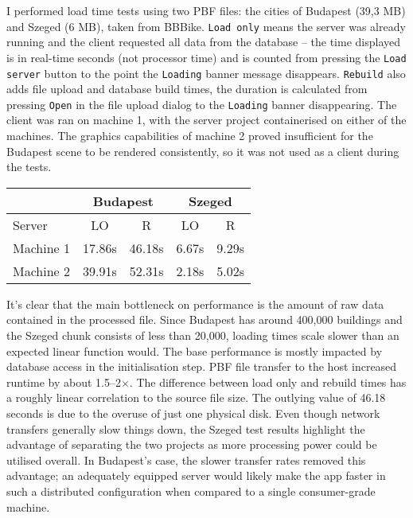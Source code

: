 I performed load time tests using two PBF files: the cities of Budapest (39,3 MB) and Szeged (6 MB), taken from BBBike. \verb|Load only| means the server was already running and the client requested all data from the database -- the time displayed is in real-time seconds (not processor time) and is counted from pressing the \verb|Load server| button to the point the \verb|Loading| banner message disappears. \verb|Rebuild| also adds file upload and database build times, the duration is calculated from pressing \verb|Open| in the file upload dialog to the \verb|Loading| banner disappearing. The client was ran on machine 1, with the server project containerised on either of the machines. The graphics capabilities of machine 2 proved insufficient for the Budapest scene to be rendered consistently, so it was not used as a client during the tests.

\begin{center}
    \begin{tabular}{l|cc|cc}
        \multicolumn{1}{c}{} & \multicolumn{2}{c}{Budapest} & \multicolumn{2}{c}{Szeged} \\
        \hline
        Server & LO & R & LO & R \\
        \hline
        Machine 1 & 17.86s & 46.18s & 6.67s & 9.29s \\
        Machine 2 & 39.91s & 52.31s & 2.18s & 5.02s \\
    \end{tabular}
\end{center}
It's clear that the main bottleneck on performance is the amount of raw data contained in the processed file. Since Budapest has around 400,000 buildings and the Szeged chunk consists of less than 20,000, loading times scale slower than an expected linear function would. The base performance is mostly impacted by database access in the initialisation step. PBF file transfer to the host increased runtime by about 1.5--2$\times$. The difference between load only and rebuild times has a roughly linear correlation to the source file size.
The outlying value of 46.18 seconds is due to the overuse of just one physical disk. Even though network transfers generally slow things down, the Szeged test results highlight the advantage of separating the two projects as more processing power could be utilised overall. In Budapest's case, the slower transfer rates removed this advantage; an adequately equipped server would likely make the app faster in such a distributed configuration when compared to a single consumer-grade machine.

